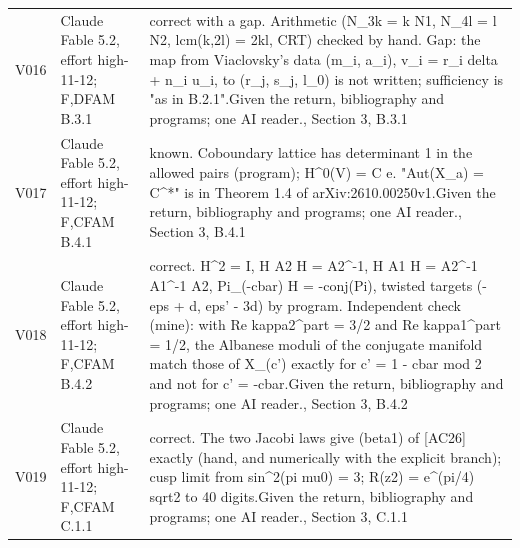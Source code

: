 \begin{longtable}{@{}L{.08\linewidth}L{.31\linewidth}L{.56\linewidth}@{}}
V016 & Claude Fable 5.2, effort high-11-12; F,D\newline FAM B.3.1 & correct with a gap. Arithmetic (N\_\allowbreak{}3k = k N1, N\_\allowbreak{}4l = l N2, lcm(k,2l) = 2kl, CRT) checked by hand. Gap:\allowbreak{} the map from Viaclovsky's data (m\_\allowbreak{}i, a\_\allowbreak{}i), v\_\allowbreak{}i = r\_\allowbreak{}i delta + n\_\allowbreak{}i u\_\allowbreak{}i, to (r\_\allowbreak{}j, s\_\allowbreak{}j, l\_\allowbreak{}0) is not written; sufficiency is "as in B.2.1".\newline Given the return, bibliography and programs; one AI reader.\newline {}, Section 3, B.3.1\\
V017 & Claude Fable 5.2, effort high-11-12; F,C\newline FAM B.4.1 & known. Coboundary lattice has determinant 1 in the allowed pairs (program); H\textasciicircum{}0(V) = C e. "Aut(X\_\allowbreak{}a) = C\textasciicircum{}*" is in Theorem 1.4 of arXiv:\allowbreak{}2610.00250v1.\newline Given the return, bibliography and programs; one AI reader.\newline {}, Section 3, B.4.1\\
V018 & Claude Fable 5.2, effort high-11-12; F,C\newline FAM B.4.2 & correct. H\textasciicircum{}2 = I, H A2 H = A2\textasciicircum{}-1, H A1 H = A2\textasciicircum{}-1 A1\textasciicircum{}-1 A2, Pi\_\allowbreak{}(-cbar) H = -conj(Pi), twisted targets (-eps + d, eps' - 3d) by program. Independent check (mine):\allowbreak{} with Re kappa2\textasciicircum{}part = 3/\allowbreak{}2 and Re kappa1\textasciicircum{}part = 1/\allowbreak{}2, the Albanese moduli of the conjugate manifold match those of X\_\allowbreak{}(c') exactly for c' = 1 - cbar mod 2 and not for c' = -cbar.\newline Given the return, bibliography and programs; one AI reader.\newline {}, Section 3, B.4.2\\
V019 & Claude Fable 5.2, effort high-11-12; F,C\newline FAM C.1.1 & correct. The two Jacobi laws give (beta1) of [AC26] exactly (hand, and numerically with the explicit branch); cusp limit from sin\textasciicircum{}2(pi mu0) = 3; R(z2) = e\textasciicircum{}(pi/\allowbreak{}4) sqrt2 to 40 digits.\newline Given the return, bibliography and programs; one AI reader.\newline {}, Section 3, C.1.1\\

\end{longtable}
